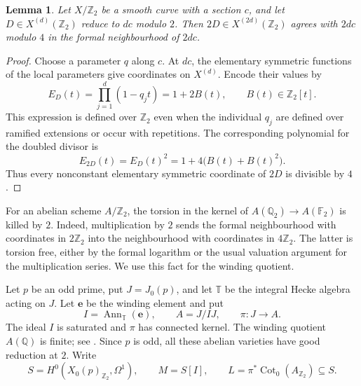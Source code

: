 \documentclass[11pt]{article}
\newtheorem{lemma}[theorem]{Lemma}
\theoremstyle{remark}\newtheorem{remark}[theorem]{Remark}
\newcommand{\Q}{\mathbb Q}\newcommand{\Z}{\mathbb Z}
\newcommand{\F}{\mathbb F}\newcommand{\T}{\mathbb T}
\newcommand{\ee}{\mathbf e}
\DeclareMathOperator{\Cot}{Cot}\DeclareMathOperator{\Lie}{Lie}
\DeclareMathOperator{\Ann}{Ann}\DeclareMathOperator{\Hom}{Hom}
\begin{document}
\begin{lemma}\label{lem:double}
Let $X/\Z_2$ be a smooth curve with a section $c$, and let
$D\in X^{(d)}(\Z_2)$ reduce to $dc$ modulo $2$.
Then $2D\in X^{(2d)}(\Z_2)$ agrees with $2dc$ modulo $4$ in the
formal neighbourhood of $2dc$.
\end{lemma}
\begin{proof}
Choose a parameter $q$ along $c$. At $dc$, the elementary symmetric
functions of the local parameters give coordinates on $X^{(d)}$.
Encode their values by
\[
 E_D(t)=\prod_{j=1}^d(1-q_jt)=1+2B(t),\qquad B(t)\in\Z_2[t].
\]
This expression is defined over $\Z_2$ even when the individual $q_j$
are defined over ramified extensions or occur with repetitions.
The corresponding polynomial for the doubled divisor is
\[
 E_{2D}(t)=E_D(t)^2=1+4\bigl(B(t)+B(t)^2\bigr).
\]
Thus every nonconstant elementary symmetric coordinate of $2D$ is
divisible by $4$.
\end{proof}

For an abelian scheme $A/\Z_2$, the torsion in the kernel of
$A(\Q_2)\to A(\F_2)$ is killed by $2$.
Indeed, multiplication by $2$ sends the formal neighbourhood
with coordinates in $2\Z_2$ into the neighbourhood with coordinates
in $4\Z_2$. The latter is torsion free, either by the formal logarithm
or the usual valuation argument for the multiplication series.
We use this fact for the winding quotient.

Let $p$ be an odd prime, put $J=J_0(p)$, and let $\T$ be the integral
Hecke algebra acting on $J$. Let $\ee$ be the winding element and put
\[
 I=\Ann_{\T}(\ee),\qquad A=J/IJ,\qquad \pi:J\longrightarrow A.
\]
The ideal $I$ is saturated and $\pi$ has connected kernel.
The winding quotient $A(\Q)$ is finite; see
\cite[Section~3.8]{Parent}.
Since $p$ is odd, all these abelian varieties have good reduction at $2$.
Write
\[
 S=H^0(X_0(p)_{\Z_2},\Omega^1),\qquad
 M=S[I],\qquad L=\pi^*\Cot_0(A_{\Z_2})\subseteq S.
\]
\end{document}
